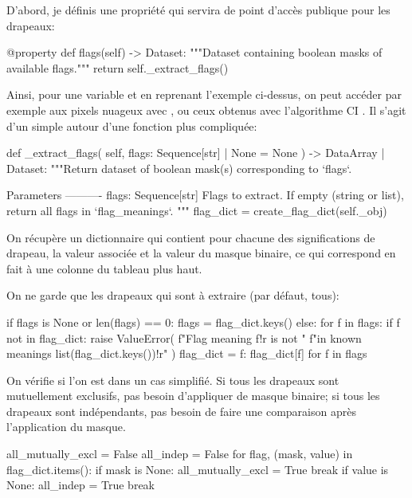 D'abord, je définis une propriété qui servira de point d'accès publique pour les drapeaux:
\begin{python}
@property
def flags(self) -> Dataset:
    """Dataset containing boolean masks of available flags."""
    return self._extract_flags()
\end{python}
Ainsi, pour une variable  et en reprenant l'exemple ci-dessus, on peut accéder par exemple aux pixels nuageux avec , ou ceux obtenus avec l'algorithme CI .
Il s'agit d'un simple  autour d'une fonction plus compliquée:
\begin{pythonFirst}
def _extract_flags(
        self, flags: Sequence[str] | None = None
) -> DataArray | Dataset:
    """Return dataset of boolean mask(s) corresponding to `flags`.

    Parameters
    ----------
    flags: Sequence[str]
        Flags to extract. If empty (string or list),
        return all flags in `flag_meanings`.
    """
    flag_dict = create_flag_dict(self._obj)
\end{pythonFirst}
On récupère un dictionnaire qui contient pour chacune des significations de drapeau, la valeur associée et la valeur du masque binaire, ce qui correspond en fait à une colonne du tableau plus haut.

On ne garde que les drapeaux qui sont à extraire (par défaut, tous):
\begin{pythonMiddle}[]
    if flags is None or len(flags) == 0:
        flags = flag_dict.keys()
    else:
        for f in flags:
            if f not in flag_dict:
                raise ValueError(
                    f"Flag meaning {f!r} is not "
                    f"in known meanings {list(flag_dict.keys())!r}"
                )
        flag_dict = {f: flag_dict[f] for f in flags}
\end{pythonMiddle}

On vérifie si l'on est dans un cas simplifié. Si tous les drapeaux sont mutuellement exclusifs, pas besoin d'appliquer de masque binaire; si tous les drapeaux sont indépendants, pas besoin de faire une comparaison après l'application du masque.
\begin{pythonMiddle}[]
    all_mutually_excl = False
    all_indep = False
    for flag, (mask, value) in flag_dict.items():
        if mask is None:
            all_mutually_excl = True
            break
        if value is None:
            all_indep = True
            break
\end{pythonMiddle}


